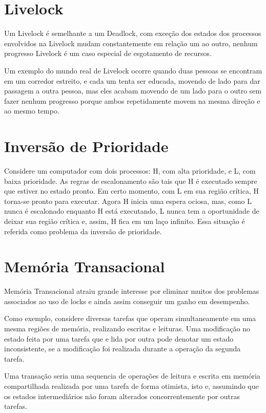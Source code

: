 \section{Livelock}

Um Livelock é semelhante a um Deadlock, com exceção dos estados dos processos envolvidos na 
Livelock mudam constantemente em relação um ao outro, nenhum progresso Livelock é um caso 
especial de esgotamento de recursos.

Um exemplo do mundo real de Livelock ocorre quando duas pessoas se encontram em um corredor 
estreito, e cada um tenta ser educada, movendo de lado para  dar passagem a outra pessoa, 
mas eles acabam movendo de um lado para o outro sem fazer nenhum progresso porque ambos 
repetidamente movem na mesma direção e ao mesmo tempo.

\section{Inversão de Prioridade}

Considere um computador com dois processos: H, com alta prioridade, e L, com baixa prioridade. 
As regras de escalonamento são tais que H é executado sempre que estiver no estado pronto. 
Em certo momento, com L em sua região crítica, H torna-se pronto para executar. Agora H inicia 
uma espera ociosa, mas, como L nunca é escalonado enquanto H está executando, L nunca tem a 
oportunidade de deixar sua região crítica e, assim, H fica em um laço infinito. Essa situação 
é referida como problema da inversão de prioridade.

\section{Memória Transacional}

Memória Transacional atraiu grande interesse por eliminar muitos dos 
problemas associados ao uso de locks e ainda assim conseguir um ganho em desempenho.


Como exemplo, considere diversas tarefas que operam simultaneamente em uma mesma regiões 
de memória, realizando escritas e leituras. Uma modificação no estado feita por uma tarefa 
que e lida por outra pode denotar um estado inconsistente, se a modificação foi realizada 
durante a operação da segunda tarefa.

Uma transação seria uma sequencia de operações de leitura e escrita em memória compartilhada 
realizada por uma tarefa de forma otimista, isto e, assumindo que os estados intermediários 
não foram alterados
 concorrentemente por outras tarefas.


